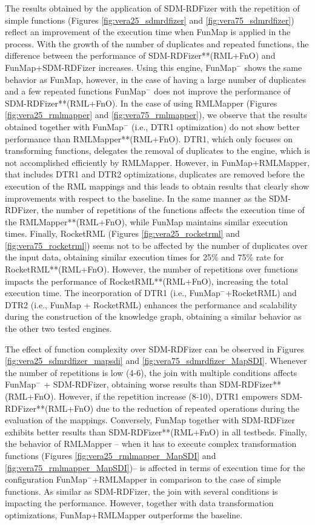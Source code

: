 The results obtained by the application of SDM-RDFizer with the repetition of simple functions (Figures \ref{fig:vera25_sdmrdfizer} and \ref{fig:vera75_sdmrdfizer}) reflect an improvement of the execution time when FunMap is applied in the process. With the growth of the number of duplicates and repeated functions, the difference between the performance of SDM-RDFizer**(RML+FnO) and FunMap+SDM-RDFizer increases. Using this engine, FunMap$^-$ shows the same behavior as FunMap, however, in the case of having a large number of duplicates and a few repeated functions FunMap$^-$ does not improve the performance of SDM-RDFizer**(RML+FnO). 
In the case of using RMLMapper (Figures \ref{fig:vera25_rmlmapper} and \ref{fig:vera75_rmlmapper}), we observe that the results obtained together with FunMap$^-$ (i.e., DTR1 optimization) do not show better performance than RMLMapper**(RML+FnO). DTR1, which only focuses on transforming functions, delegates the removal of duplicates to the engine, which is not accomplished efficiently by RMLMapper. However, in FunMap+RMLMapper, that includes DTR1 and DTR2 optimizations, duplicates are removed before the execution of the RML mappings and this leads to obtain results that clearly show improvements with respect to the baseline. In the same manner as the SDM-RDFizer, the number of repetitions of the functions affects the execution time of the RMLMapper**(RML+FnO), while FunMap maintains similar execution times. Finally, RocketRML (Figures \ref{fig:vera25_rocketrml} and \ref{fig:vera75_rocketrml}) seems not to be affected by the number of duplicates over the input data, obtaining similar execution times for 25\% and 75\% rate for RocketRML**(RML+FnO). However, the number of repetitions over functions impacts the performance of RocketRML**(RML+FnO), increasing the total execution time. The incorporation of DTR1 (i.e., FunMap$^-$+RocketRML) and DTR2 (i.e., FunMap + RocketRML) enhances the performance and scalability during the construction of the knowledge graph, obtaining a similar behavior as the other two tested engines. 

The effect of function complexity over SDM-RDFizer can be observed in Figures \ref{fig:vera25_sdmrdfizer_mapsdi} and \ref{fig:vera75_sdmrdfizer_MapSDI}. Whenever the number of repetitions is low (4-6), the join with multiple conditions affects FunMap$^-$ + SDM-RDFizer, obtaining worse results than SDM-RDFizer**(RML+FnO). However, if the repetition increase (8-10), DTR1 empowers SDM-RDFizer**(RML+FnO) due to the reduction of repeated operations during the evaluation of the mappings. Conversely, FunMap together with SDM-RDFizer exhibits better results than SDM-RDFizer**(RML+FnO) in all testbeds. Finally, the behavior of RMLMapper -- when it has to execute complex transformation functions (Figures \ref{fig:vera25_rmlmapper_MapSDI} and \ref{fig:vera75_rmlmapper_MapSDI})-- is affected in terms of execution time for the configuration FunMap$^-$+RMLMapper in comparison to the case of simple functions. As similar as SDM-RDFizer, the join with several conditions is impacting the performance. However, together with data transformation optimizations, FunMap+RMLMapper outperforms the baseline. 

